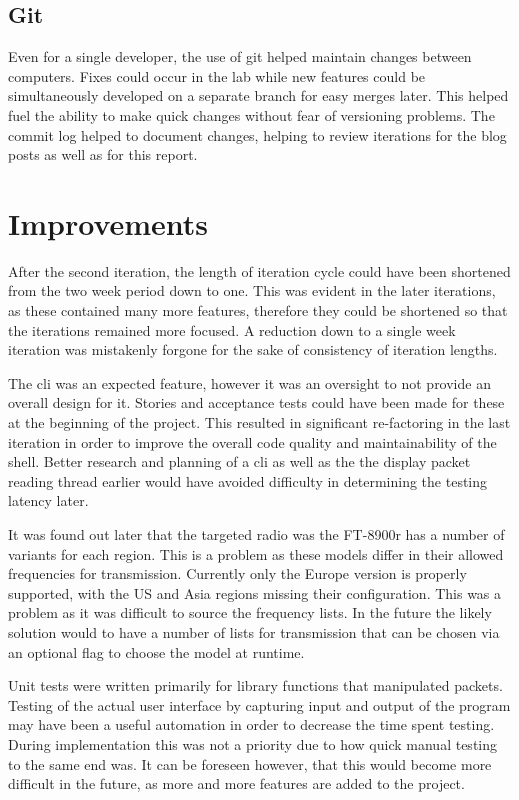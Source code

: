 \subsection*{Git}
Even for a single developer, the use of git helped maintain changes between computers. Fixes could occur in the lab while new features could be simultaneously developed on a separate branch for easy merges later. This helped fuel the ability to make quick changes without fear of versioning problems. The commit log helped to document changes, helping to review iterations for the blog posts as well as for this report. 

\section{Improvements}

After the second iteration, the length of iteration cycle could have been shortened from the two week period down to one. This was evident in the later iterations, as these contained many more features, therefore they could be shortened so that the iterations remained more focused. A reduction down to a single week iteration was mistakenly forgone for the sake of consistency of iteration lengths. 

The \gls{cli} was an expected feature, however it was an oversight to not provide an overall design for it. Stories and acceptance tests could have been made for these at the beginning of the project. This resulted in significant re-factoring in the last iteration in order to improve the overall code quality and maintainability of the shell. Better research and planning of a \gls{cli} as well as the the display packet reading thread earlier would have avoided difficulty in determining the testing latency later.

It was found out later that the targeted radio was the FT-8900r has a number of variants for each region. This is a problem as these models differ in their allowed frequencies for transmission. Currently only the Europe version is properly supported, with the US and Asia regions missing their configuration. This was a problem as it was difficult to source the frequency lists. In the future the likely solution would to have a number of lists for transmission that can be chosen via an optional flag to choose the model at runtime.

Unit tests were written primarily for library functions that manipulated packets. Testing of the actual user interface by capturing input and output of the program may have been a useful automation in order to decrease the time spent testing. During implementation this was not a priority due to how quick manual testing to the same end was. It can be foreseen however, that this would become more difficult in the future, as more and more features are added to the project.


